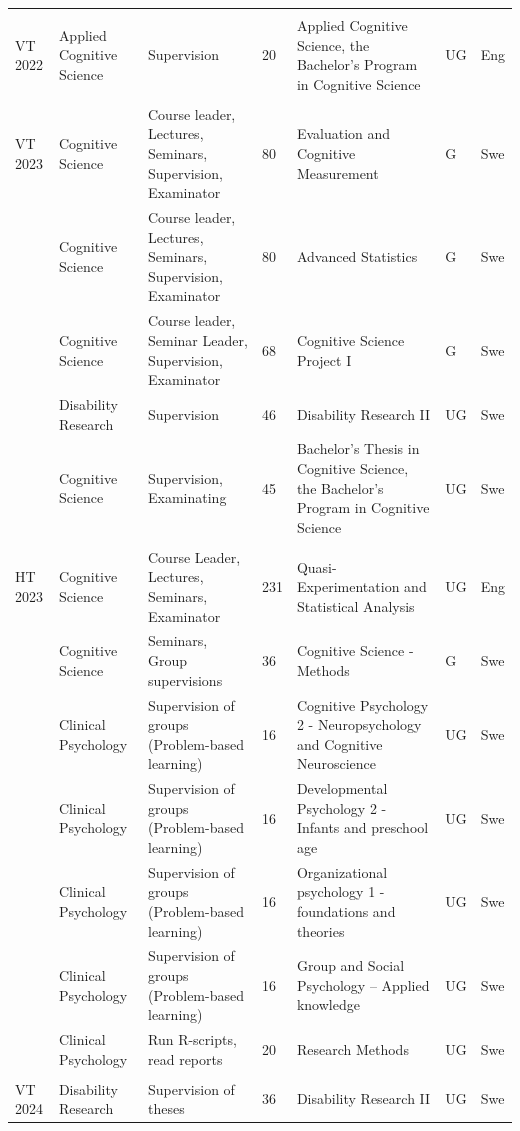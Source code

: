 \documentclass[]{article}
\begin{document}
\begin{landscape}
\begin{ThreePartTable}
\begin{longtable}[t]{l>{\raggedright\arraybackslash}p{5cm}>{\raggedright\arraybackslash}p{5cm}l>{\raggedright\arraybackslash}p{5cm}ll}
\addlinespace
 &  &  &  &  &  \vphantom{5} & \\
VT 2022 & Applied Cognitive Science & Supervision & 20 & Applied Cognitive Science, the Bachelor's Program in Cognitive Science & UG & Eng\\
 &  &  &  &  &  \vphantom{4} & \\
VT 2023 & Cognitive Science & Course leader, Lectures, Seminars, Supervision, Examinator & 80 & Evaluation and Cognitive Measurement & G & Swe\\
 & Cognitive Science & Course leader, Lectures, Seminars, Supervision, Examinator & 80 & Advanced Statistics & G & Swe\\
\addlinespace
 & Cognitive Science & Course leader, Seminar Leader, Supervision, Examinator & 68 & Cognitive Science Project I & G & Swe\\
 & Disability Research & Supervision & 46 & Disability Research II & UG & Swe\\
 & Cognitive Science & Supervision, Examinating & 45 & Bachelor's Thesis in Cognitive Science, the Bachelor's Program in Cognitive Science & UG & Swe\\
 &  &  &  &  &  \vphantom{3} & \\
HT 2023 & Cognitive Science & Course Leader, Lectures, Seminars, Examinator & 231 & Quasi-Experimentation and Statistical Analysis & UG & Eng\\
\addlinespace
 & Cognitive Science & Seminars, Group supervisions & 36 & Cognitive Science - Methods & G & \vphantom{1} Swe\\
 & Clinical Psychology & Supervision of groups (Problem-based learning) & 16 & Cognitive Psychology 2 - Neuropsychology and Cognitive Neuroscience & UG & \vphantom{1} Swe\\
 & Clinical Psychology & Supervision of groups (Problem-based learning) & 16 & Developmental Psychology 2 - Infants and preschool age & UG & Swe\\
 & Clinical Psychology & Supervision of groups (Problem-based learning) & 16 & Organizational psychology 1 - foundations and theories & UG & Swe\\
 & Clinical Psychology & Supervision of groups (Problem-based learning) & 16 & Group and Social Psychology – Applied knowledge & UG & Swe\\
\addlinespace
 & Clinical Psychology & Run R-scripts, read reports & 20 & Research Methods & UG & Swe\\
 &  &  &  &  &  \vphantom{2} & \\
VT 2024 & Disability Research & Supervision of theses & 36 & Disability Research II & UG & Swe\\

\end{longtable}
\end{ThreePartTable}
\end{landscape}
\end{document}
